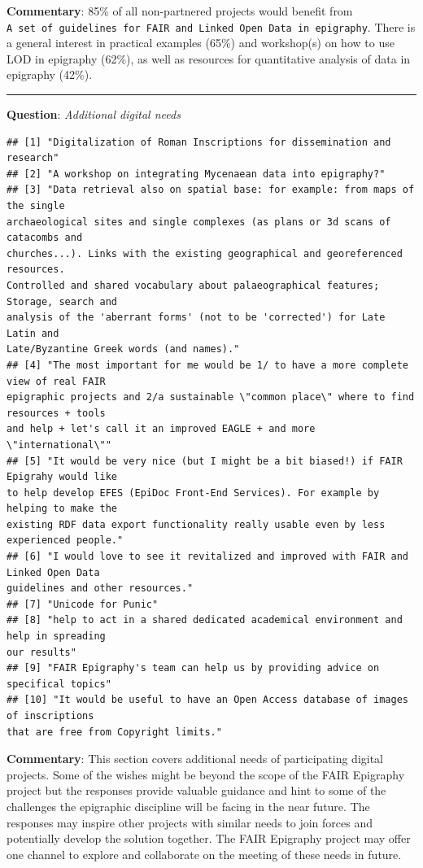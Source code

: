 \documentclass[
  12pt,
]{scrreprt}
\begin{document}
\textbf{Commentary}: 85\% of all non-partnered projects would benefit
from
\texttt{A\ set\ of\ guidelines\ for\ FAIR\ and\ Linked\ Open\ Data\ in\ epigraphy}.
There is a general interest in practical examples (65\%) and workshop(s)
on how to use LOD in epigraphy (62\%), as well as resources for
quantitative analysis of data in epigraphy (42\%).

\begin{center}\rule{0.5\linewidth}{0.5pt}\end{center}

\textbf{Question}: \emph{Additional digital needs}

\begin{verbatim}
## [1] "Digitalization of Roman Inscriptions for dissemination and research"
## [2] "A workshop on integrating Mycenaean data into epigraphy?"
## [3] "Data retrieval also on spatial base: for example: from maps of the single
archaeological sites and single complexes (as plans or 3d scans of catacombs and
churches...). Links with the existing geographical and georeferenced resources.
Controlled and shared vocabulary about palaeographical features; Storage, search and
analysis of the 'aberrant forms' (not to be 'corrected') for Late Latin and
Late/Byzantine Greek words (and names)."
## [4] "The most important for me would be 1/ to have a more complete view of real FAIR
epigraphic projects and 2/a sustainable \"common place\" where to find resources + tools
and help + let's call it an improved EAGLE + and more \"international\""
## [5] "It would be very nice (but I might be a bit biased!) if FAIR Epigrahy would like
to help develop EFES (EpiDoc Front-End Services). For example by helping to make the
existing RDF data export functionality really usable even by less experienced people."
## [6] "I would love to see it revitalized and improved with FAIR and Linked Open Data
guidelines and other resources."
## [7] "Unicode for Punic"
## [8] "help to act in a shared dedicated academical environment and help in spreading
our results"
## [9] "FAIR Epigraphy's team can help us by providing advice on specifical topics"
## [10] "It would be useful to have an Open Access database of images of inscriptions
that are free from Copyright limits."
\end{verbatim}

\textbf{Commentary}: This section covers additional needs of
participating digital projects. Some of the wishes might be beyond the
scope of the FAIR Epigraphy project but the responses provide valuable
guidance and hint to some of the challenges the epigraphic discipline
will be facing in the near future. The responses may inspire other
projects with similar needs to join forces and potentially develop the
solution together. The FAIR Epigraphy project may offer one channel to
explore and collaborate on the meeting of these needs in future.
\end{document}
